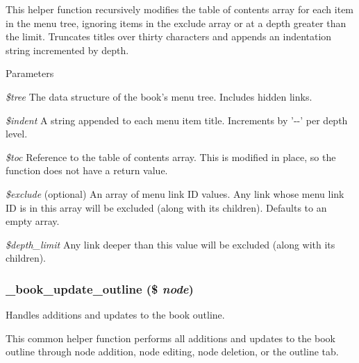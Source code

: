 This helper function recursively modifies the table of contents array for each item in the menu tree, ignoring items in the exclude array or at a depth greater than the limit. Truncates titles over thirty characters and appends an indentation string incremented by depth.


\begin{DoxyParams}{Parameters}
\item[{\em \$tree}]The data structure of the book's menu tree. Includes hidden links. \item[{\em \$indent}]A string appended to each menu item title. Increments by '-\/-\/' per depth level. \item[{\em \$toc}]Reference to the table of contents array. This is modified in place, so the function does not have a return value. \item[{\em \$exclude}](optional) An array of menu link ID values. Any link whose menu link ID is in this array will be excluded (along with its children). Defaults to an empty array. \item[{\em \$depth\_\-limit}]Any link deeper than this value will be excluded (along with its children). \end{DoxyParams}
\hypertarget{book_8module_a83ee69e0480634db0ef6a18a7b45d03f}{
\subsubsection[{\_\-book\_\-update\_\-outline}]{\setlength{\rightskip}{0pt plus 5cm}\_\-book\_\-update\_\-outline (\$ {\em node})}}
\label{book_8module_a83ee69e0480634db0ef6a18a7b45d03f}
Handles additions and updates to the book outline.

This common helper function performs all additions and updates to the book outline through node addition, node editing, node deletion, or the outline tab.


